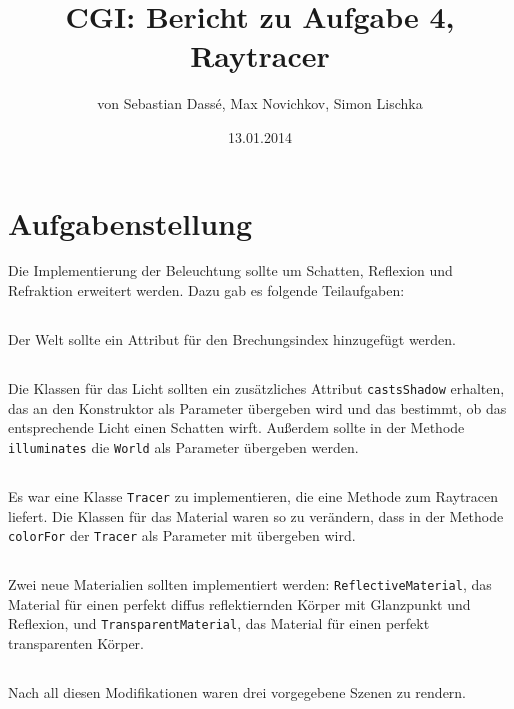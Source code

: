 \documentclass[11pt]{amsart}
\title{CGI: Bericht zu Aufgabe 4, Raytracer}
\author{von Sebastian Dass\'{e}, Max Novichkov, Simon Lischka }
\date{13.01.2014}
\begin{document}
\maketitle

\section{Aufgabenstellung}
Die Implementierung der Beleuchtung sollte um Schatten, Reflexion und Refraktion erweitert werden. Dazu gab es folgende 
Teilaufgaben: 

\subsection{}
Der Welt sollte ein Attribut f\"ur den Brechungsindex hinzugef\"ugt werden.

\subsection{}
Die Klassen f\"ur das Licht sollten ein zus\"atzliches Attribut \texttt{castsShadow} erhalten, das an den Konstruktor 
als Parameter \"ubergeben wird und das bestimmt, ob das entsprechende Licht einen Schatten wirft. Au\ss{}erdem sollte 
in der Methode \texttt{illuminates} die \texttt{World} als Parameter \"ubergeben werden.

\subsection{}
Es war eine Klasse \texttt{Tracer} zu implementieren, die eine Methode zum Raytracen liefert. Die Klassen f\"ur das 
Material waren so zu ver\"andern, dass in der Methode \texttt{colorFor} der \texttt{Tracer} als Parameter mit 
\"ubergeben wird.

\subsection{}
Zwei neue Materialien sollten implementiert werden: \texttt{ReflectiveMaterial}, das Material f\"ur einen perfekt 
diffus reflektiernden K\"orper mit Glanzpunkt und Reflexion, und \texttt{TransparentMaterial}, das Material f\"ur einen 
perfekt transparenten K\"orper.

\subsection{}
Nach all diesen Modifikationen waren drei vorgegebene Szenen zu rendern.
\end{document}

